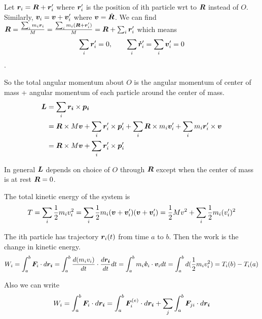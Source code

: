 \documentclass[12pt]{article}
\begin{document}
Let $\boldsymbol{r}_i = \boldsymbol{R} + \boldsymbol{r}_i'$ where $\boldsymbol{r}_i'$ is the position of ith particle wrt to $\boldsymbol{R}$ instead of $O$. Similarly, $\boldsymbol{v}_i = \boldsymbol{v} + \boldsymbol{v}_i'$ where $\boldsymbol{v} = \dot{\boldsymbol{R}}$.  We can find $\boldsymbol{R} = \frac{\sum_i m_i \boldsymbol{r}_i}{M} = \frac{\sum_i m_i (\boldsymbol{R} + \boldsymbol{r}_i')}{M} = \boldsymbol{R} + \sum_i \boldsymbol{r}_i' $ which means $$\sum_i  \boldsymbol{r}_i' = 0, \quad\quad \sum_i  \boldsymbol{\dot{r}}_i' = \sum_i  \boldsymbol{v}_i' = 0 $$.

So the total angular momentum about $O$ is the angular momentum of center of mass + angular momentum of each particle around the center of mass. 
$$\begin{aligned}
	\boldsymbol{L} &=  \sum_i \boldsymbol{r_i}\times \boldsymbol{p_i} \\
	       &=\boldsymbol{R}\times M \boldsymbol{v} + \sum_i \boldsymbol{r}_i'\times \boldsymbol{p}_i' + \sum_i \boldsymbol{R}\times m_i \boldsymbol{v}_i' + \sum_i m_i \boldsymbol{r}_i' \times \boldsymbol{v} \\
	       &=    \boldsymbol{R}\times M \boldsymbol{v} + \sum_i \boldsymbol{r}_i'\times \boldsymbol{p}_i'
\end{aligned}
$$

In general $\boldsymbol{L}$ depends on choice of $O$ through $\boldsymbol{R}$ except when the center of mass is at rest $\boldsymbol{R} = 0$.

The total kinetic energy of the system is $$
T = \sum_i \frac{1}{2}m_i v_i^2 =  \sum_i \frac{1}{2} m_i (\boldsymbol{v} + \boldsymbol{v}_i') (\boldsymbol{v} + \boldsymbol{v}_i') = \frac{1}{2} M v^2 + \sum_i \frac{1}{2}m_i (v_i')^2 
$$

The ith particle has trajectory $\boldsymbol{r}_i(t)$ from time $a$ to $b$. Then the work is the change in kinetic energy.
$$W_i = \int_a^b \boldsymbol{F}_i  \cdot  d\boldsymbol{r_i} =  \int_a^b \frac{d(m_i v_i)}{dt}   \cdot  \frac{d \boldsymbol{r_i}}{dt} dt =  \int_a^b  m_i \boldsymbol{\dot{v}}_i  \cdot \boldsymbol{v}_i dt =  \int_a^b  d(\frac{1}{2} m_i v_i^2) = T_i(b) - T_i(a)$$

Also we can write 
$$
 W_i = \int_a^b \boldsymbol{F}_i  \cdot  d\boldsymbol{r_i}  = \int_a^b \boldsymbol{F}_i^{(e)}  \cdot  d\boldsymbol{r_i}  +  \sum_j \int_a^b \boldsymbol{F}_{ji} \cdot  d\boldsymbol{r_i}
$$
\end{document}
